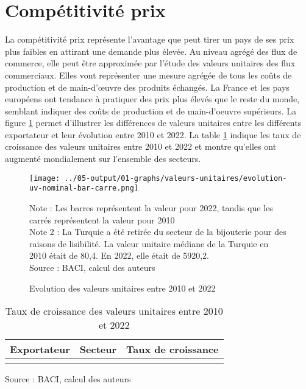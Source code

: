 \documentclass[french,10pt,a4paper]{article}
\begin{document}
\section{Compétitivité prix}
La compétitivité prix représente l'avantage que peut tirer un pays de ses prix plus faibles en attirant une demande plus élevée. Au niveau agrégé des flux de commerce, elle peut être approximée par l'étude des valeurs unitaires des flux commerciaux. Elles vont représenter une mesure agrégée de tous les coûts de production et de main-d'œuvre des produits échangés. La France et les pays européens ont tendance à pratiquer des prix plus élevés que le reste du monde, semblant indiquer des coûts de production et de main-d'oeuvre supérieurs. La figure \ref{fig:valeurs-unitaires} permet d'illustrer les différences de valeurs unitaires entre les différents exportateur et leur évolution entre 2010 et 2022. La table \ref{tab:taux-croissance-uv} indique les taux de croissance des valeurs unitaires entre 2010 et 2022 et montre qu'elles ont augmenté mondialement sur l'ensemble des secteurs. 

\begin{figure}[!h]
  \centering
  \texttt{[image: ../05-output/01-graphs/valeurs-unitaires/evolution-uv-nominal-bar-carre.png]}
  \captionsetup{justification=justified, singlelinecheck=false, font=small}
  \caption*{Note : Les barres représentent la valeur pour 2022, tandis que les carrés représentent la valeur pour 2010 \\
  Note 2 : La Turquie a été retirée du secteur de la bijouterie pour des raisons de lisibilité. La valeur unitaire médiane de la Turquie en 2010 était de 80,4. En 2022, elle était de 5920,2. \\
  Source : BACI, calcul des auteurs}
  \captionsetup{justification=centering, singlelinecheck=true, font=normalsize}
  \caption{Evolution des valeurs unitaires entre 2010 et 2022}
  \label{fig:valeurs-unitaires}
\end{figure}

\begin{table}[ht]
  \centering
  \begin{tabular}{lrr}
    \hline
   Exportateur & Secteur & Taux de croissance \\
    \hline
    \\
    \hline
  \end{tabular}
  \captionsetup{justification=raggedright,singlelinecheck=false, font=small}
  \caption*{Source : BACI, calcul des auteurs}
  \captionsetup{justification=centering, singlelinecheck=true, font=normalsize}
  \caption{Taux de croissance des valeurs unitaires entre 2010 et 2022}
  \label{tab:taux-croissance-uv}
\end{table}
\end{document}
